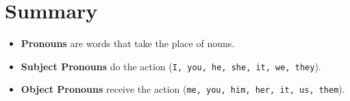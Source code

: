 \section{Summary}
\begin{summarybox}
    \begin{itemize}
        \item \textbf{Pronouns} are words that take the place of nouns.
        \item \textbf{Subject Pronouns} do the action (\texttt{I, you, he, she, it, we, they}).
        \item \textbf{Object Pronouns} receive the action (\texttt{me, you, him, her, it, us, them}).
    \end{itemize}
\end{summarybox}